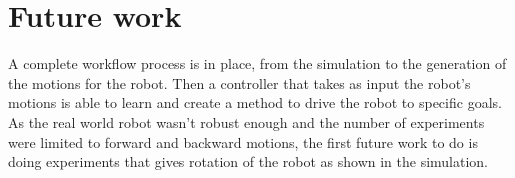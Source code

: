 \section{Future work}
    A complete workflow process is in place, from the simulation to the generation of the motions for the robot. Then a controller that takes as input the robot's motions is able to learn and create a method to drive the robot to specific goals. As the real world robot wasn't robust enough and the number of experiments were limited to forward and backward motions, the first future work to do is doing experiments that gives rotation of the robot as shown in the simulation.